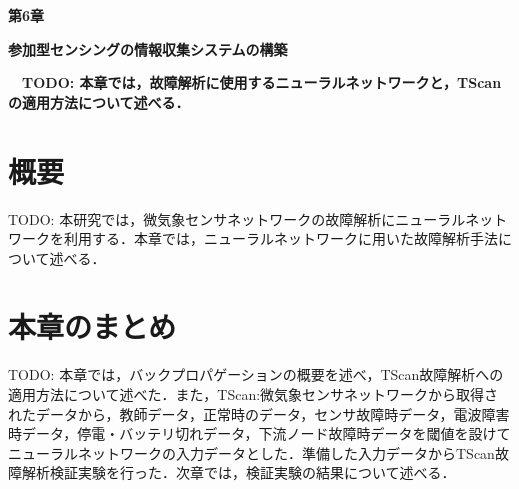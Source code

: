 \newpage
\setcounter{chapter}{6}
\setcounter{section}{0}

\begin{center}
\vspace{0.5cm}
\huge{\bf 第6章}
\par
\vspace{1cm}
\hrulefill
\par
\vspace{1cm}
\huge{\bf 参加型センシングの情報収集システムの構築}
\par
\vspace{0.5cm}
\hrulefill
\vspace{1cm}
\par

\begin{flushleft}
\large{{\bf　TODO: 本章では，故障解析に使用するニューラルネットワークと，TScanの適用方法について述べる．}}
\end{flushleft}
\end{center}


\newpage
\section{概要}
TODO: 本研究では，微気象センサネットワークの故障解析にニューラルネットワークを利用する．本章では，ニューラルネットワークに用いた故障解析手法について述べる．

\newpage

\section{本章のまとめ}
TODO: 本章では，バックプロパゲーションの概要を述べ，TScan故障解析への適用方法について述べた．また，TScan:微気象センサネットワークから取得されたデータから，教師データ，正常時のデータ，センサ故障時データ，電波障害時データ，停電・バッテリ切れデータ，下流ノード故障時データを閾値を設けてニューラルネットワークの入力データとした．準備した入力データからTScan故障解析検証実験を行った．次章では，検証実験の結果について述べる．
\newpage
